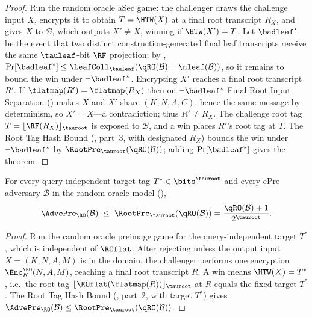 \begin{proof}
Run the random oracle aSec game: the challenger draws the challenge input
$X$, encrypts it to obtain $T = \HTW(X)$ at a final root transcript $R_X$,
and gives $X$ to $\mathcal{B}$, which outputs $X' \neq X$, winning if
$\HTW(X') = T$. Let $\badleaf^\star$ be the event that two distinct
construction-generated final leaf transcripts receive the same
$\tauleaf$-bit $\RF$ projection; by ,
$\Pr[\badleaf^\star] \leq \LeafColl_{\tauleaf}(\qRO(\mathcal{B})+\nleaf(\mathcal{B}))$,
so it remains to bound the win under $\neg\badleaf^\star$. Encrypting $X'$
reaches a final root transcript $R'$. If $\flatmap(R') = \flatmap(R_X)$
then on $\neg\badleaf^\star$ Final-Root Input Separation
() makes $X$ and $X'$ share $(K,N,A,C)$, hence
the same message by determinism, so $X' = X$---a contradiction; thus
$R' \neq R_X$. The challenge root tag
$T = \lfloor \RF(R_X) \rfloor_{\tauroot}$ is exposed to $\mathcal{B}$, and
a win places $R'$'s root tag at $T$. The Root Tag Hash Bound
(, part~3, with designated $R_X$) bounds the win
under $\neg\badleaf^\star$ by $\RootPre_{\tauroot}(\qRO(\mathcal{B}))$;
adding $\Pr[\badleaf^\star]$ gives the theorem.
\end{proof}

\begin{theorem}
\label{thm:epre-ro}
For every query-independent target tag $T^* \in \bits^{\tauroot}$ and
every ePre adversary $\mathcal{B}$ in the \TW{}
random oracle model (),
\[
  \AdvePre_\RO(\mathcal{B})
  \;\leq\; \RootPre_{\tauroot}(\qRO(\mathcal{B}))
  = \frac{\qRO(\mathcal{B}) + 1}{2^{\tauroot}}.
\]
\end{theorem}

\begin{proof}
Run the random oracle preimage game for the query-independent target
$T^*$, which is independent of $\ROflat$. After rejecting unless the
output input $X = (K,N,A,M)$ is in the \TW{} domain, the challenger
performs one encryption $\Enc_{K}^\RO(N,A,M)$, reaching a final root
transcript $R$. A win means $\HTW(X) = T^*$, i.e.\ the root tag
$\lfloor \ROflat(\flatmap(R)) \rfloor_{\tauroot}$ at $R$ equals the fixed
target $T^*$. The Root Tag Hash Bound (, part~2,
with target $T^*$) gives
$\AdvePre_\RO(\mathcal{B}) \leq \RootPre_{\tauroot}(\qRO(\mathcal{B}))$.
\end{proof}

